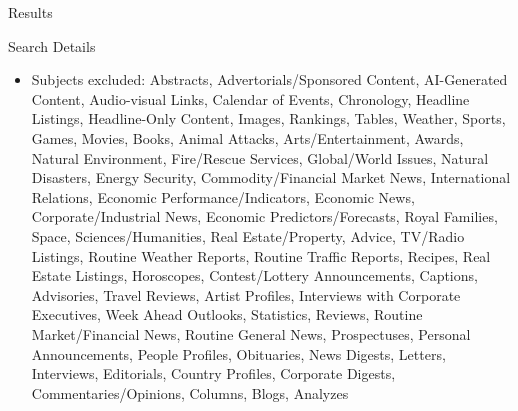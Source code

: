 \documentclass[aspectratio=169,10pt]{beamer}
\begin{document}
\begin{section}[Results]{Results}
\begin{frame}{Search Details}\label{search_details}
\begin{itemize}
\footnotesize
\item Subjects excluded: Abstracts, Advertorials/Sponsored Content, AI-Generated Content, Audio-visual Links, Calendar of Events, Chronology, Headline Listings, Headline-Only Content, Images, Rankings, Tables, Weather, Sports, Games, Movies, Books, Animal Attacks, Arts/Entertainment, Awards, Natural Environment, Fire/Rescue Services, Global/World Issues, Natural Disasters, Energy Security, Commodity/Financial Market News, International Relations, Economic Performance/Indicators, Economic News, Corporate/Industrial News, Economic Predictors/Forecasts, Royal Families, Space, Sciences/Humanities, Real Estate/Property, Advice, TV/Radio Listings, Routine Weather Reports, Routine Traffic Reports, Recipes, Real Estate Listings, Horoscopes, Contest/Lottery Announcements, Captions, Advisories, Travel Reviews, Artist Profiles, Interviews with Corporate Executives, Week Ahead Outlooks, Statistics, Reviews, Routine Market/Financial News, Routine General News, Prospectuses, Personal Announcements, People Profiles, Obituaries, News Digests, Letters, Interviews, Editorials, Country Profiles, Corporate Digests, Commentaries/Opinions, Columns, Blogs, Analyzes
\end{itemize}
    
\end{frame}






\end{section}
\end{document}
